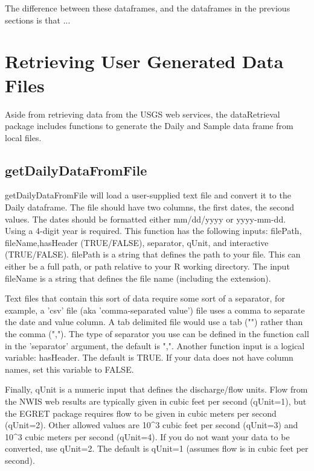 \documentclass[a4paper,11pt]{article}
\begin{document}
The difference between these dataframes, and the dataframes in the previous sections is that ...


\newpage
\section{Retrieving User Generated Data Files}
Aside from retrieving data from the USGS web services, the dataRetrieval package includes functions to generate the Daily and Sample data frame from local files.

\subsection{getDailyDataFromFile}
getDailyDataFromFile will load a user-supplied text file and convert it to the Daily dataframe. The file should have two columns, the first dates, the second values.  The dates should be formatted either mm/dd/yyyy or yyyy-mm-dd. Using a 4-digit year is required. This function has the following inputs: filePath, fileName,hasHeader (TRUE/FALSE), separator, qUnit, and interactive (TRUE/FALSE). filePath is a string that defines the path to your file. This can either be a full path, or path relative to your R working directory. The input fileName is a string that defines the file name (including the extension).

Text files that contain this sort of data require some sort of a separator, for example, a 'csv' file (aka 'comma-separated value') file uses a comma to separate the date and value column. A tab delimited file would use a tab ("\verb@\t@") rather than the comma (","). The type of separator you use can be defined in the function call in the 'separator' argument, the default is ",". Another function input is a logical variable: hasHeader.  The default is TRUE. If your data does not have column names, set this variable to FALSE.

Finally, qUnit is a numeric input that defines the discharge/flow units. Flow from the NWIS web results are typically given in cubic feet per second (qUnit=1), but the EGRET package requires flow to be given in cubic meters per second (qUnit=2). Other allowed values are 10^3 cubic feet per second (qUnit=3) and 10^3 cubic meters per second (qUnit=4). If you do not want your data to be converted, use qUnit=2. The default is qUnit=1 (assumes flow is in cubic feet per second).
\end{document}
